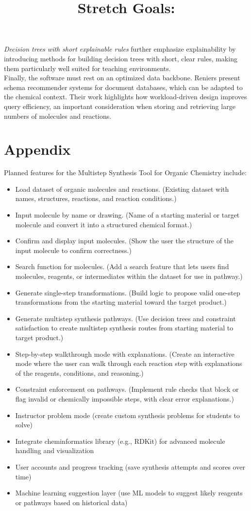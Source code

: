 \documentclass[12pt]{article}
\begin{document}
\textit{Decision trees with short explainable rules} further emphasize explainability by introducing methods for building decision trees with short, clear rules, making them particularly well suited for teaching environments. \cite{10.1016/j.tcs.2025.115344}
\\
\indent
Finally, the software must rest on an optimized data backbone. Reniers present schema recommender systems for document databases, which can be adapted to the chemical context. Their work highlights how workload-driven design improves query efficiency, an important consideration when storing and retrieving large numbers of molecules and reactions. \cite{10.1007/978-3-030-62522-1_35}



\newpage
\section*{Appendix}
Planned features for the Multistep Synthesis Tool for Organic Chemistry include:
\begin{itemize}
	\item Load dataset of organic molecules and reactions. (Existing dataset with names, structures, reactions, and reaction conditions.)
	\item Input molecule by name or drawing. (Name of a starting material or target molecule and convert it into a structured chemical format.)
	\item Confirm and display input molecules. (Show the user the structure of the input molecule to confirm correctness.)
	\item Search function for molecules. (Add a search feature that lets users find molecules, reagents, or intermediates within the dataset for use in pathway.)
	\item Generate single-step transformations. (Build logic to propose valid one-step transformations from the starting material toward the target product.)
	\item Generate multistep synthesis pathways. (Use decision trees and constraint satisfaction to create multistep synthesis routes from starting material to target product.)
	\item Step-by-step walkthrough mode with explanations. (Create an interactive mode where the user can walk through each reaction step with explanations of the reagents, conditions, and reasoning.)
	\item Constraint enforcement on pathways. (Implement rule checks that block or flag invalid or chemically impossible steps, with clear error explanations.)
	
	\title{\textbf{Stretch Goals:}}
	\item Instructor problem mode (create custom synthesis problems for students to solve)
	\item Integrate cheminformatics library (e.g., RDKit) for advanced molecule handling and visualization
	\item User accounts and progress tracking (save synthesis attempts and scores over time)
	\item Machine learning suggestion layer (use ML models to suggest likely reagents or pathways based on historical data)
\end{itemize}




\end{document}
